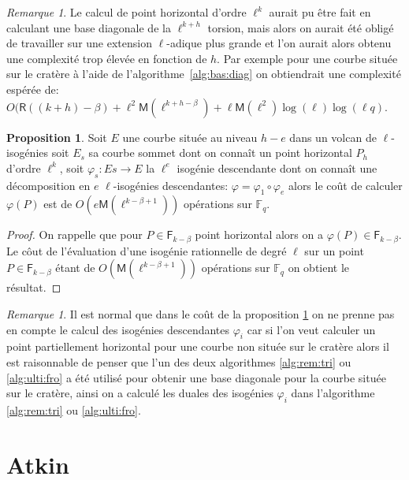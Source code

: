 \documentclass[10pt,a4paper]{book}
\theoremstyle{plain}
\theoremstyle{definition}
\theoremstyle{definition}
\theoremstyle{definition}
\newtheorem{prop}[thm]{Proposition}
\theoremstyle{definition}
\theoremstyle{remark}
\newtheorem{rem}[thm]{Remarque}
\theoremstyle{remark}
\theoremstyle{definition}
\begin{document}
\begin{rem}
Le calcul de point horizontal d'ordre $\ell^k$ aurait pu être fait en calculant une base diagonale de la $\ell^{k+h}$ torsion, mais alors on aurait été obligé de travailler sur une extension $\ell$-adique plus grande et l'on aurait alors obtenu une complexité trop élevée en fonction de $h$. Par exemple pour une courbe située sur le cratère à l'aide de l'algorithme~\ref{alg:bas:diag} on obtiendrait une complexité espérée de: $O(\mathsf{R}((k+h)-\beta)+\ell^{2}\mathsf{M}(\ell^{k+h-\beta})+\ell\mathsf{M}(\ell^2)\log(\ell)\log(\ell q)$.  
\end{rem}

\begin{prop}
\label{pro:par:hor}
Soit $E$ une courbe située au niveau $h-e$ dans un volcan de $\ell$-isogénies soit $E_s$ sa courbe sommet dont on connaît un point horizontal $P_h$ d'ordre $\ell^k$, soit $\varphi_s:Es \rightarrow E $ la $\ell^{e}$ isogénie descendante dont on connaît une décomposition en $e$ $\ell$-isogénies descendantes: $\varphi=\varphi_1 \circ \varphi_{e}$ alors le coût de calculer $\varphi(P)$ est de $O(e\mathsf{M}(\ell^{k-\beta+1}))$ opérations sur $\mathbb{F}_q$.
\end{prop}

\begin{proof}
On rappelle que pour $P \in \mathsf{F}_{k-\beta}$ point horizontal alors on a  $\varphi(P) \in \mathsf{F}_{k-\beta}$. Le côut de l'évaluation d'une isogénie rationnelle de degré $\ell$ sur un point $P \in \mathsf{F}_{k-\beta}$ étant de $O(\mathsf{M}(\ell^{k-\beta+1}))$ opérations sur $\mathbb{F}_q$ on obtient le résultat.
\end{proof}

\begin{rem}
Il est normal que dans le coût de la proposition \ref{pro:par:hor} on ne prenne pas en compte le calcul des isogénies descendantes $\varphi_i$ car si l'on veut calculer un point partiellement horizontal pour une courbe non située sur le cratère alors il est raisonnable de penser que l'un des deux algorithmes  \ref{alg:rem:tri} ou \ref{alg:ulti:fro} a été utilisé pour obtenir une base diagonale pour la courbe située sur le cratère, ainsi on a calculé les duales des isogénies $\varphi_i$ dans l'algorithme \ref{alg:rem:tri} ou \ref{alg:ulti:fro}.
\end{rem}


\section{Atkin}
\end{document}
